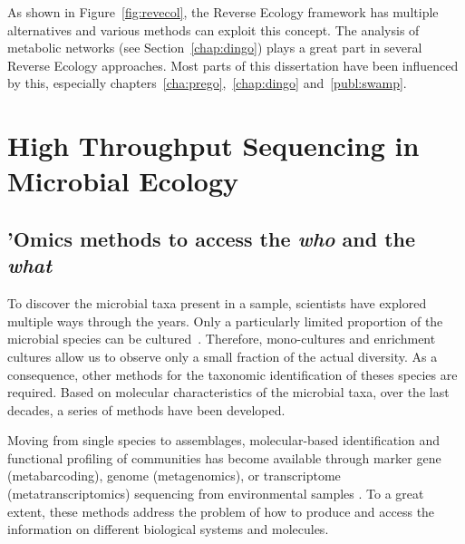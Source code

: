       As shown in Figure~\ref{fig:revecol}, the Reverse Ecology framework 
      has multiple alternatives and various methods can exploit this concept.
      The analysis of metabolic networks (see Section~\ref{chap:dingo}) 
      plays a great part in several Reverse Ecology approaches.
      Most parts of this dissertation have been influenced by this, especially 
      chapters~\ref{cha:prego},~\ref{chap:dingo} and~\ref{publ:swamp}.
      



\section{High Throughput Sequencing in Microbial Ecology}

   \subsection{'Omics methods to access the \textit{who} and the \textit{what}}
   \label{subsec:omics}
      To discover the microbial taxa present in a sample, scientists have 
      explored multiple ways through the years. 
      Only a particularly limited proportion of the microbial species 
      can be cultured~\citep{steen2019high}.
      Therefore, mono-cultures and enrichment cultures allow us to observe 
      only a small fraction of the actual diversity. 
      As a consequence, other methods for the taxonomic identification of theses
      species are required.
      Based on molecular characteristics of the microbial taxa, 
      over the last decades, a series of methods have been developed. 
 
      Moving from single species to assemblages, molecular-based identification and functional 
      profiling of communities has become available through marker gene (metabarcoding), 
      genome (metagenomics), or transcriptome (metatranscriptomics) sequencing from environmental 
      samples \citep{goldford2018emergent}. 
      To a great extent, these methods address the problem of how to produce and access 
      the information on different biological systems and molecules.

